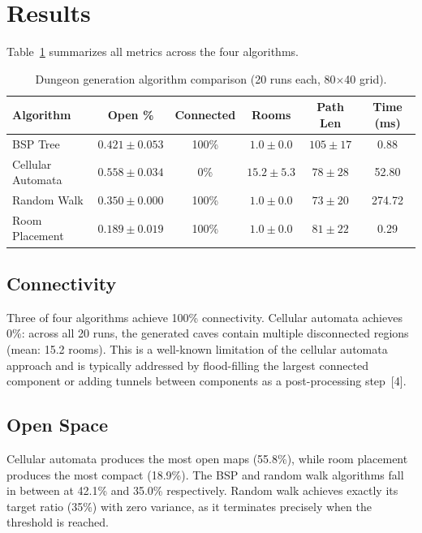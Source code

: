 \documentclass[11pt,a4paper]{article}
\begin{document}
\section{Results}

Table~\ref{tab:comparison} summarizes all metrics across the four algorithms.

\begin{table}[H]
\centering
\caption{Dungeon generation algorithm comparison (20 runs each, 80$\times$40 grid).}
\label{tab:comparison}
\begin{tabular}{lccccc}
\toprule
\textbf{Algorithm} & \textbf{Open \%} & \textbf{Connected} & \textbf{Rooms} & \textbf{Path Len} & \textbf{Time (ms)} \\
\midrule
BSP Tree & $0.421 \pm 0.053$ & 100\% & $1.0 \pm 0.0$ & $105 \pm 17$ & 0.88 \\
Cellular Automata & $0.558 \pm 0.034$ & 0\% & $15.2 \pm 5.3$ & $78 \pm 28$ & 52.80 \\
Random Walk & $0.350 \pm 0.000$ & 100\% & $1.0 \pm 0.0$ & $73 \pm 20$ & 274.72 \\
Room Placement & $0.189 \pm 0.019$ & 100\% & $1.0 \pm 0.0$ & $81 \pm 22$ & 0.29 \\
\bottomrule
\end{tabular}
\end{table}

\subsection{Connectivity}

Three of four algorithms achieve 100\% connectivity. Cellular automata achieves 0\%: across all 20 runs, the generated caves contain multiple disconnected regions (mean: 15.2 rooms). This is a well-known limitation of the cellular automata approach and is typically addressed by flood-filling the largest connected component or adding tunnels between components as a post-processing step~[4].

\subsection{Open Space}

Cellular automata produces the most open maps (55.8\%), while room placement produces the most compact (18.9\%). The BSP and random walk algorithms fall in between at 42.1\% and 35.0\% respectively. Random walk achieves exactly its target ratio (35\%) with zero variance, as it terminates precisely when the threshold is reached.
\end{document}
